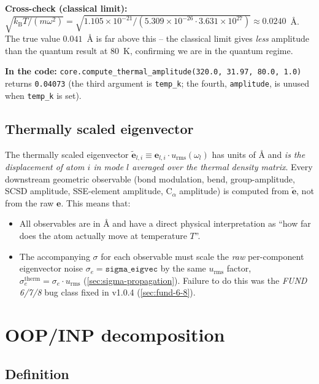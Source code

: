 \documentclass[10pt,a4paper,twoside]{article}
\newcommand{\evec}{\mathbf{e}}
\newcommand{\kB}{k_{\mathrm{B}}}
\newcommand{\urms}{u_{\mathrm{rms}}}
\newcommand{\fn}[1]{\texttt{#1}}
\newcommand{\cfgkey}[1]{\texttt{#1}}
\begin{document}
\begin{workedexample}[$\urms$ for an Fe-S stretch at 80~K]
\textbf{Cross-check (classical limit):}
$\sqrt{\kB T/(m\omega^2)} = \sqrt{1.105 \times 10^{-21} /
(5.309 \times 10^{-26} \cdot 3.631 \times 10^{27})}
\approx 0.0240$~\AA{}. The true value $0.041$~\AA{} is far above
this -- the classical limit gives \emph{less} amplitude than the
quantum result at 80~K, confirming we are in the quantum regime.

\textbf{In the code:}
\fn{core.compute\_thermal\_amplitude(320.0, 31.97, 80.0, 1.0)} returns
\texttt{0.04073} (the third argument is \cfgkey{temp\_k};
the fourth, \cfgkey{amplitude}, is unused when \cfgkey{temp\_k}
is set).
\end{workedexample}

\subsection{Thermally scaled eigenvector}

The thermally scaled eigenvector $\widetilde{\evec}_{l,i}
\equiv \evec_{l,i} \cdot \urms(\omega_l)$ has units of \AA{} and
\emph{is the displacement of atom $i$ in mode $l$ averaged over the
thermal density matrix}. Every downstream geometric observable
(bond modulation, bend, group-amplitude, SCSD amplitude, SSE-element
amplitude, C$_\alpha$ amplitude) is computed from
$\widetilde{\evec}$, not from the raw $\evec$. This means that:

\begin{itemize}
  \item All observables are in \AA{} and have a direct physical
        interpretation as ``how far does the atom actually move at
        temperature $T$''.
  \item The accompanying $\sigma$ for each observable must scale the
        \emph{raw} per-component eigenvector noise
        $\sigma_e = \cfgkey{sigma\_eigvec}$ by the same $\urms$
        factor, $\sigma_e^\text{therm} = \sigma_e \cdot \urms$
        (\cref{sec:sigma-propagation}). Failure to do this was the
        \emph{FUND 6/7/8} bug class fixed in v1.0.4
        (\cref{sec:fund-6-8}).
\end{itemize}

\section{OOP/INP decomposition}
\label{sec:oop-derivation}

\subsection{Definition}
\end{document}
